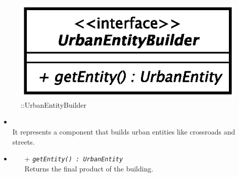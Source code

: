 \begin{figure}[h]
\centering
\includegraphics[scale=0.6,keepaspectratio]{images/solution/app/backend/urban_entity_builder.eps}
\caption{\pReactiveBuild::UrbanEntityBuilder}
\label{fig:sd-app-UrbanEntitybuilder}
\end{figure}
\FloatBarrier
\begin{itemize}
  \item \textbf{\descr} \\
    It represents a component that builds urban entities like crossroads and
    streets.
  \item \textbf{\ops}
  \begin{itemize}
    \item[+] \texttt{\textit{getEntity() : UrbanEntity}} \\
Returns the final product of the building.
  \end{itemize}
\end{itemize}
